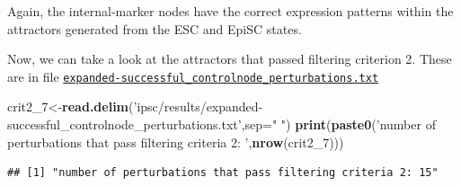 \documentclass[
]{book}
\newenvironment{Shaded}{\begin{snugshade}}{\end{snugshade}}
\newcommand{\DataTypeTok}[1]{\textcolor[rgb]{0.13,0.29,0.53}{#1}}
\newcommand{\DecValTok}[1]{\textcolor[rgb]{0.00,0.00,0.81}{#1}}
\newcommand{\KeywordTok}[1]{\textcolor[rgb]{0.13,0.29,0.53}{\textbf{#1}}}
\newcommand{\NormalTok}[1]{#1}
\newcommand{\OperatorTok}[1]{\textcolor[rgb]{0.81,0.36,0.00}{\textbf{#1}}}
\newcommand{\StringTok}[1]{\textcolor[rgb]{0.31,0.60,0.02}{#1}}
\begin{document}
Again, the internal-marker nodes have the correct expression patterns within the attractors generated from the ESC and EpiSC states.

Now, we can take a look at the attractors that passed filtering criterion 2. These are in file \href{https://github.com/VeraLiconaResearchGroup/Netisce/blob/main/ipsc_validation/results/expanded-successful_controlnode_perturbations.txt}{\texttt{expanded-successful\_controlnode\_perturbations.txt}}

\begin{Shaded}
\begin{Highlighting}[]
\NormalTok{crit2_}\DecValTok{7}\NormalTok{<-}\KeywordTok{read.delim}\NormalTok{(}\StringTok{'ipsc/results/expanded-successful_controlnode_perturbations.txt'}\NormalTok{,}\DataTypeTok{sep=}\StringTok{" "}\NormalTok{)}
\KeywordTok{print}\NormalTok{(}\KeywordTok{paste0}\NormalTok{(}\StringTok{'number of perturbations that pass filtering criteria 2: '}\NormalTok{,}\KeywordTok{nrow}\NormalTok{(crit2_}\DecValTok{7}\NormalTok{)))}
\end{Highlighting}
\end{Shaded}

\begin{verbatim}
## [1] "number of perturbations that pass filtering criteria 2: 15"
\end{verbatim}

\begin{Shaded}
\end{Shaded}
\end{document}
